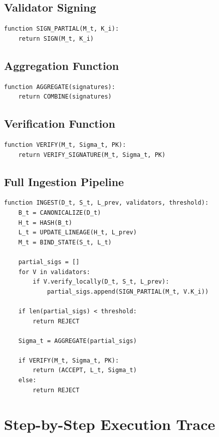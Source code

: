 \subsection{Validator Signing}

\begin{verbatim}
function SIGN_PARTIAL(M_t, K_i):
    return SIGN(M_t, K_i)
\end{verbatim}

\subsection{Aggregation Function}

\begin{verbatim}
function AGGREGATE(signatures):
    return COMBINE(signatures)
\end{verbatim}

\subsection{Verification Function}

\begin{verbatim}
function VERIFY(M_t, Sigma_t, PK):
    return VERIFY_SIGNATURE(M_t, Sigma_t, PK)
\end{verbatim}

\subsection{Full Ingestion Pipeline}

\begin{verbatim}
function INGEST(D_t, S_t, L_prev, validators, threshold):
    B_t = CANONICALIZE(D_t)
    H_t = HASH(B_t)
    L_t = UPDATE_LINEAGE(H_t, L_prev)
    M_t = BIND_STATE(S_t, L_t)

    partial_sigs = []
    for V in validators:
        if V.verify_locally(D_t, S_t, L_prev):
            partial_sigs.append(SIGN_PARTIAL(M_t, V.K_i))

    if len(partial_sigs) < threshold:
        return REJECT

    Sigma_t = AGGREGATE(partial_sigs)

    if VERIFY(M_t, Sigma_t, PK):
        return (ACCEPT, L_t, Sigma_t)
    else:
        return REJECT
\end{verbatim}

\section{Step-by-Step Execution Trace}

